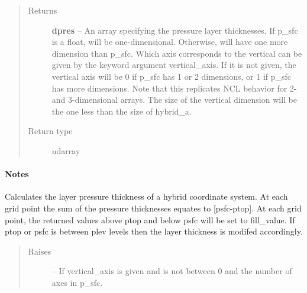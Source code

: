 \documentclass[letterpaper,10pt,english]{sphinxmanual}
\begin{document}
\begin{fulllineitems}
\begin{quote}
\begin{description}
\item[{Returns}] \leavevmode
\textbf{dpres} --
An array specifying the pressure layer thicknesses. If p\_sfc is a
float, will be one-dimensional. Otherwise, will have one more dimension
than p\_sfc. Which axis corresponds to the vertical can be given by the
keyword argument vertical\_axis. If it is not given, the vertical axis
will be 0 if p\_sfc has 1 or 2 dimensions, or 1 if p\_sfc has more
dimensions. Note that this replicates NCL behavior for 2- and
3-dimensional arrays. The size of the vertical dimension will be the
one less than the size of hybrid\_a.

\item[{Return type}] \leavevmode
ndarray

\end{description}\end{quote}
\paragraph{Notes}

Calculates the layer pressure thickness of a hybrid coordinate system. At
each grid point the sum of the pressure thicknesses equates to {[}psfc-ptop{]}.
At each grid point, the returned values above ptop and below psfc will be
set to fill\_value. If ptop or psfc is between plev levels then the layer
thickness is modifed accordingly.
\begin{quote}\begin{description}
\item[{Raises}] \leavevmode
{} --
If vertical\_axis is given and is not between 0 and the number of
axes in p\_sfc.

\end{description}\end{quote}

\end{fulllineitems}

\end{document}

